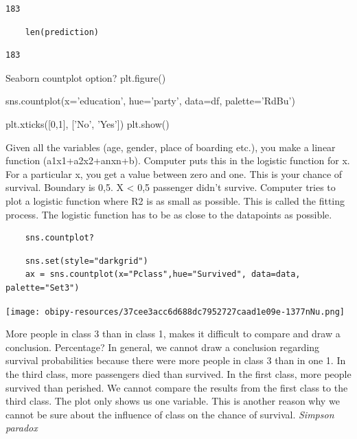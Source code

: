 \documentclass[11pt]{article}
\begin{document}
\begin{verbatim}
183
\end{verbatim}

\begin{verbatim}
    len(prediction)
\end{verbatim}

\begin{verbatim}
183
\end{verbatim}

Seaborn countplot option? plt.figure()

sns.countplot(x='education', hue='party', data=df, palette='RdBu')

plt.xticks([0,1], ['No', 'Yes']) plt.show()

Given all the variables (age, gender, place of boarding etc.), you make
a linear function (a1x1+a2x2+anxn+b). Computer puts this in the logistic
function for x. For a particular x, you get a value between zero and
one. This is your chance of survival. Boundary is 0,5. X < 0,5 passenger
didn't survive. Computer tries to plot a logistic function where R2 is
as small as possible. This is called the fitting process. The logistic
function has to be as close to the datapoints as possible.

\begin{verbatim}
    sns.countplot?
\end{verbatim}

\begin{verbatim}
    sns.set(style="darkgrid")
    ax = sns.countplot(x="Pclass",hue="Survived", data=data, palette="Set3")
\end{verbatim}

\begin{center}
\texttt{[image: obipy-resources/37cee3acc6d688dc7952727caad1e09e-1377nNu.png]}
\end{center}

More people in class 3 than in class 1, makes it difficult to compare
and draw a conclusion. Percentage? In general, we cannot draw a
conclusion regarding survival probabilities because there were more
people in class 3 than in one 1. In the third class, more passengers
died than survived. In the first class, more people survived than
perished. We cannot compare the results from the first class to the
third class. The plot only shows us one variable. This is another reason
why we cannot be sure about the influence of class on the chance of
survival. \emph{Simpson paradox}
\end{document}

